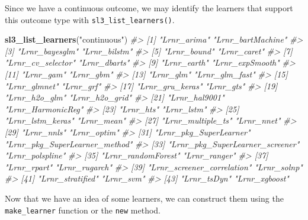 \documentclass[12pt, krantz2,]{book}
\newenvironment{Shaded}{\begin{snugshade}}{\end{snugshade}}
\newcommand{\CommentTok}[1]{\textcolor[rgb]{0.56,0.35,0.01}{\textit{#1}}}
\newcommand{\KeywordTok}[1]{\textcolor[rgb]{0.13,0.29,0.53}{\textbf{#1}}}
\newcommand{\NormalTok}[1]{#1}
\newcommand{\OperatorTok}[1]{\textcolor[rgb]{0.81,0.36,0.00}{\textbf{#1}}}
\newcommand{\StringTok}[1]{\textcolor[rgb]{0.31,0.60,0.02}{#1}}
\theoremstyle{definition}
\theoremstyle{definition}
\theoremstyle{definition}
\newcommand{\1}{\mathbbm{1}}
\begin{document}
Since we have a continuous outcome, we may identify the learners that support
this outcome type with \texttt{sl3\_list\_learners()}.

\begin{Shaded}
\begin{Highlighting}[]
\KeywordTok{sl3_list_learners}\NormalTok{(}\StringTok{"continuous"}\NormalTok{)}
\CommentTok{#>  [1] "Lrnr_arima"                     "Lrnr_bartMachine"              }
\CommentTok{#>  [3] "Lrnr_bayesglm"                  "Lrnr_bilstm"                   }
\CommentTok{#>  [5] "Lrnr_bound"                     "Lrnr_caret"                    }
\CommentTok{#>  [7] "Lrnr_cv_selector"               "Lrnr_dbarts"                   }
\CommentTok{#>  [9] "Lrnr_earth"                     "Lrnr_expSmooth"                }
\CommentTok{#> [11] "Lrnr_gam"                       "Lrnr_gbm"                      }
\CommentTok{#> [13] "Lrnr_glm"                       "Lrnr_glm_fast"                 }
\CommentTok{#> [15] "Lrnr_glmnet"                    "Lrnr_grf"                      }
\CommentTok{#> [17] "Lrnr_gru_keras"                 "Lrnr_gts"                      }
\CommentTok{#> [19] "Lrnr_h2o_glm"                   "Lrnr_h2o_grid"                 }
\CommentTok{#> [21] "Lrnr_hal9001"                   "Lrnr_HarmonicReg"              }
\CommentTok{#> [23] "Lrnr_hts"                       "Lrnr_lstm"                     }
\CommentTok{#> [25] "Lrnr_lstm_keras"                "Lrnr_mean"                     }
\CommentTok{#> [27] "Lrnr_multiple_ts"               "Lrnr_nnet"                     }
\CommentTok{#> [29] "Lrnr_nnls"                      "Lrnr_optim"                    }
\CommentTok{#> [31] "Lrnr_pkg_SuperLearner"          "Lrnr_pkg_SuperLearner_method"  }
\CommentTok{#> [33] "Lrnr_pkg_SuperLearner_screener" "Lrnr_polspline"                }
\CommentTok{#> [35] "Lrnr_randomForest"              "Lrnr_ranger"                   }
\CommentTok{#> [37] "Lrnr_rpart"                     "Lrnr_rugarch"                  }
\CommentTok{#> [39] "Lrnr_screener_correlation"      "Lrnr_solnp"                    }
\CommentTok{#> [41] "Lrnr_stratified"                "Lrnr_svm"                      }
\CommentTok{#> [43] "Lrnr_tsDyn"                     "Lrnr_xgboost"}
\end{Highlighting}
\end{Shaded}

Now that we have an idea of some learners, we can construct them using the
\texttt{make\_learner} function or the \texttt{new} method.

\begin{Shaded}
\end{Shaded}
\end{document}
